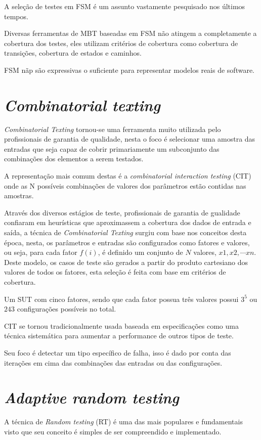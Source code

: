\documentclass[
	12pt,				%
	oneside,			%
	a4paper,			%
	english,			%
	brazil				%
	]{abntex2ppgsi}
\begin{document}
A seleção de testes em FSM é um assunto vastamente pesquisado nos últimos tempos.

Diversas ferramentas de MBT baseadas em FSM não atingem a completamente a cobertura dos testes, eles utilizam critérios de cobertura como cobertura de transições, cobertura de estados e caminhos.

FSM nãp são expressivas o suficiente para representar modelos reais de software.

\section{\textit{Combinatorial texting}}

\textit{Combinatorial Texting} tornou-se uma ferramenta muito utilizada pelo profissionais de garantia de qualidade, nesta o foco é selecionar uma amostra das entradas que seja capaz de cobrir primariamente um subconjunto das combinações dos elementos a serem testados.

A representação mais comum destas é a \textit{combinatorial interaction testing} (CIT) onde as N possíveis combinações de valores dos parâmetros estão contidas nas amostras.

Através dos diversos estágios de teste, profissionais de garantia de gualidade confiaram em heurísticas que aproximassem a cobertura dos dados de entrada e saída, a técnica de \textit{Combinatorial Texting} surgiu com base nos conceitos desta época, nesta, os parâmetros e entradas são configurados como fatores e valores, ou seja, para cada fator $f(i)$, é definido um conjunto de $N$ valores, {${x1, x2,\cdots xn}$}. Deste modelo, os casos de teste são gerados a partir do produto cartesiano dos valores de todos os fatores, esta seleção é feita com base em critérios de cobertura.

Um SUT com cinco fatores, sendo que cada fator possua três valores possui $3^{5}$ ou $243$ configurações possíveis no total.

CIT se tornou tradicionalmente usada baseada em especificações como uma técnica sistemática para aumentar a performance de outros tipos de teste.

Seu foco é detectar um tipo específico de  falha, isso é dado por conta das iterações em cima das combinações das entradas ou das configurações.


\section{\textit{Adaptive random testing}}
A técnica de \textit{Random testing} (RT) é uma das mais populares e fundamentais visto que seu conceito é simples de ser compreendido e implementado. 
\end{document}
